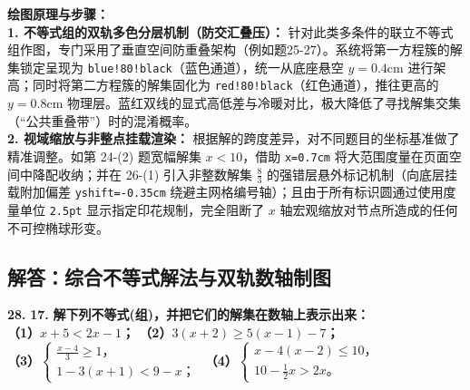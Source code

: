 \vspace{0.4cm}
{\small\color{blue!70!black}
\textbf{绘图原理与步骤：}\\
\textbf{1. 不等式组的双轨多色分层机制（防交汇叠压）：} 针对此类多条件的联立不等式组作图，专门采用了垂直空间防重叠架构（例如题25-27）。系统将第一方程簇的解集锁定呈现为 \texttt{blue!80!black}（蓝色通道），统一从底座悬空 $y=0.4\mathrm{cm}$ 进行架高；同时将第二方程簇的解集固化为 \texttt{red!80!black}（红色通道），推往更高的 $y=0.8\mathrm{cm}$ 物理层。蓝红双线的显式高低差与冷暖对比，极大降低了寻找解集交集（“公共重叠带”）时的混淆概率。\\
\textbf{2. 视域缩放与非整点挂载渲染：} 根据解的跨度差异，对不同题目的坐标基准做了精准调整。如第 24-(2) 题宽幅解集 $x < 10$，借助 \texttt{x=0.7cm} 将大范围度量在页面空间中降配收纳；并在 26-(1) 引入非整数解集 $\frac{8}{3}$ 的强错层悬外标记机制（向底层挂载附加偏差 \texttt{yshift=-0.35cm} 绕避主网格编号轴）；且由于所有标识圆通过使用度量单位 \texttt{2.5pt} 显示指定印花规制，完全阻断了 $x$ 轴宏观缩放对节点所造成的任何不可控椭球形变。
}

\newpage

\newpage

\subsection{解答：综合不等式解法与双轨数轴制图}

\vspace{0.6cm}

\textbf{\LARGE 28.} \textbf{\color{cyan!80!blue} 17. }\textbf{解下列不等式(组)，并把它们的解集在数轴上表示出来：\\
（1）$x+5 < 2x-1$； \hspace{2.5cm} （2）$3(x+2) \geqslant 5(x-1)-7$；\\[8pt]
（3）$\begin{cases} \frac{x-4}{3} \geqslant 1\text{，} \\ 1-3(x+1) < 9-x\text{；} \end{cases}$ \hspace{1cm} （4）$\begin{cases} x-4(x-2) \leqslant 10\text{，} \\ 10-\frac{1}{2}x > 2x\text{。} \end{cases}$}

